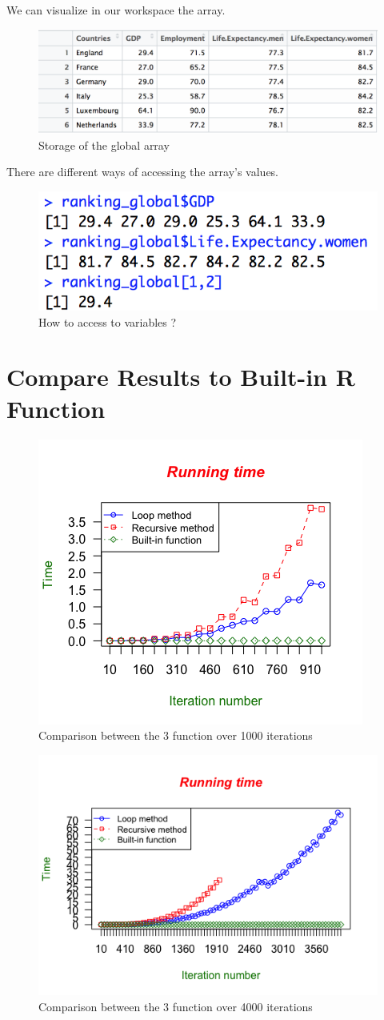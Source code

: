 \documentclass[a4paper,11pt]{article}
\begin{document}
We can visualize in our workspace the array.
\begin{figure}[H]
\centering
\includegraphics[width=.8\textwidth]{figure6}
 \caption{Storage of the global array}
\label{figure6}
\end{figure}
There are different ways of accessing the array's values.
\begin{figure}[H]
\centering
\includegraphics[width=.6\textwidth]{figure5}
 \caption{How to access to variables ?}
\label{figure5}
\end{figure}

 
\section{Compare Results to Built-in R Function}

\begin{figure}[H]
\centering
\includegraphics[width=.6\textwidth]{Time_100_iterations}
 \caption{Comparison between the 3 function over 1000 iterations}
\label{courbe1}
\end{figure}

\begin{figure}[H]
\centering
\includegraphics[width=.6\textwidth]{time_4000_iteration}
 \caption{Comparison between the 3 function over 4000 iterations}
\label{courbe2}
\end{figure}
\end{document}
